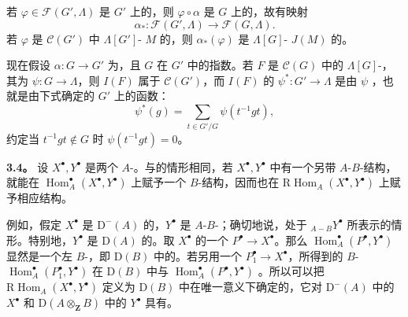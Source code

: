若 $\varphi\in\mathscr F(G',\Lambda)$ 是 $G'$ 上的，则 $\varphi\circ\alpha$ 是 $G$ 上的，故有映射
\[
\alpha_*:\mathscr F(G',\Lambda)\longrightarrow\mathscr F(G,\Lambda).
\]
若 $\varphi$ 是 $\mathscr C(G')$ 中 $\Lambda[G']$- $M$ 的，则 $\alpha_*(\varphi)$ 是 $\Lambda[G]$- $J(M)$ 的。

现在假设 $\alpha:G\longrightarrow G'$ 为，且 $G$ 在 $G'$ 中的指数。若 $F$ 是 $\mathscr C(G)$ 中的 $\Lambda[G]$-，其为 $\psi:G\longrightarrow\Lambda$，则 $I(F)$ 属于 $\mathscr C(G')$，而 $I(F)$ 的 $\psi^*:G'\longrightarrow\Lambda$ 是由 $\psi$ ，也就是由下式确定的 $G'$ 上的函数：
\[
\psi^*(g)=\sum_{t\in G'/G}\psi(t^{-1}gt),\tag{3.3.1}
\]
约定当 $t^{-1}gt\notin G$ 时 $\psi(t^{-1}gt)=0$。

\textbf{3.4。} 设 $X^\bullet,Y^\bullet$ 是两个 $A$-。与的情形相同，若 $X^\bullet,Y^\bullet$ 中有一个另带 $A$-$B$-结构，就能在 $\operatorname{Hom}_A^\bullet(X^\bullet,Y^\bullet)$ 上赋予一个 $B$-结构，因而也在 $\mathrm R\operatorname{Hom}_A(X^\bullet,Y^\bullet)$ 上赋予相应结构。

例如，假定 $X^\bullet$ 是 $\mathrm D^-(A)$ 的，$Y^\bullet$ 是 $A$-$B$-；确切地说，处于 ${}_{A-B}Y^\bullet$ 所表示的情形。特别地，$Y^\bullet$ 是 $\mathrm D(A)$ 的。取 $X^\bullet$ 的一个 $P^\bullet\longrightarrow X^\bullet$。那么 $\operatorname{Hom}_A^\bullet(P^\bullet,Y^\bullet)$ 显然是一个左 $B$-，即 $\mathrm D(B)$ 中的。若另用一个 $P_1^\bullet\longrightarrow X^\bullet$，所得到的 $B$- $\operatorname{Hom}_A^\bullet(P_1^\bullet,Y^\bullet)$ 在 $\mathrm D(B)$ 中与 $\operatorname{Hom}_A^\bullet(P^\bullet,Y^\bullet)$ 。所以可以把 $\mathrm R\operatorname{Hom}_A(X^\bullet,Y^\bullet)$ 定义为 $\mathrm D(B)$ 中在唯一意义下确定的，它对 $\mathrm D^-(A)$ 中的 $X^\bullet$ 和 $\mathrm D(A\otimes_{\mathbf Z}B)$ 中的 $Y^\bullet$ 具有。

